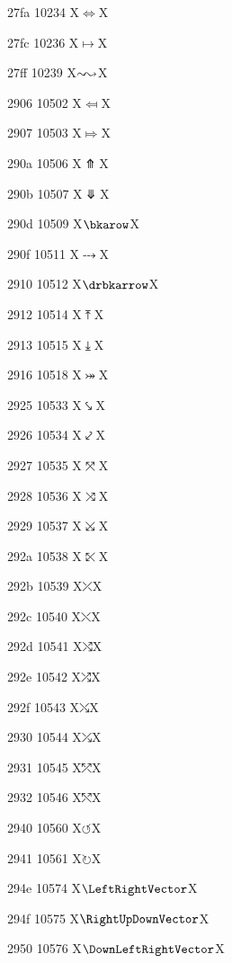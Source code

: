 \documentclass[11pt]{article}
\begin{document}
27fa 10234 X{\ensuremath{\Longleftrightarrow}}X

27fc 10236 X{\ensuremath{\longmapsto}}X

27ff 10239 X{\ensuremath{\sim\joinrel\leadsto}}X

2906 10502 X{\ensuremath{\Mapsfrom}}X

2907 10503 X{\ensuremath{\Mapsto}}X

290a 10506 X{\ensuremath{\Uuparrow}}X

290b 10507 X{\ensuremath{\Ddownarrow}}X

290d 10509 X{\ensuremath{\bkarow}}X

290f 10511 X{\ensuremath{\dbkarow}}X

2910 10512 X{\ensuremath{\drbkarrow}}X

2912 10514 X{\ensuremath{\UpArrowBar}}X

2913 10515 X{\ensuremath{\DownArrowBar}}X

2916 10518 X{\ensuremath{\twoheadrightarrowtail}}X

2925 10533 X{\ensuremath{\hksearow}}X

2926 10534 X{\ensuremath{\hkswarow}}X

2927 10535 X{\ensuremath{\tona}}X

2928 10536 X{\ensuremath{\toea}}X

2929 10537 X{\ensuremath{\tosa}}X

292a 10538 X{\ensuremath{\towa}}X

292b 10539 X{\ensuremath{\rdiagovfdiag}}X

292c 10540 X{\ensuremath{\fdiagovrdiag}}X

292d 10541 X{\ensuremath{\seovnearrow}}X

292e 10542 X{\ensuremath{\neovsearrow}}X

292f 10543 X{\ensuremath{\fdiagovnearrow}}X

2930 10544 X{\ensuremath{\rdiagovsearrow}}X

2931 10545 X{\ensuremath{\neovnwarrow}}X

2932 10546 X{\ensuremath{\nwovnearrow}}X

2940 10560 X{\ensuremath{\circlearrowleft}}X

2941 10561 X{\ensuremath{\circlearrowright}}X

294e 10574 X{\ensuremath{\LeftRightVector}}X

294f 10575 X{\ensuremath{\RightUpDownVector}}X

2950 10576 X{\ensuremath{\DownLeftRightVector}}X
\end{document}
